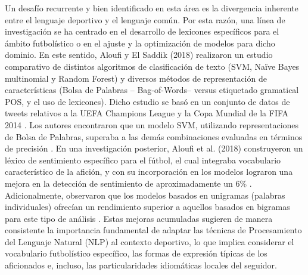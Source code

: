 Un desafío recurrente y bien identificado en esta área es la divergencia inherente entre el lenguaje deportivo y el lenguaje común. Por esta razón, una línea de investigación se ha centrado en el desarrollo de lexicones específicos para el ámbito futbolístico o en el ajuste y la optimización de modelos para dicho dominio. En este sentido, Aloufi y El Saddik (2018) realizaron un estudio comparativo de distintos algoritmos de clasificación de texto (SVM, Naïve Bayes multinomial y Random Forest) y diversos métodos de representación de características (Bolsa de Palabras – Bag-of-Words– versus etiquetado gramatical POS, y el uso de lexicones). Dicho estudio se basó en un conjunto de datos de tweets relativos a la UEFA Champions League y la Copa Mundial de la FIFA 2014 \cite{Selak2024}. Los autores encontraron que un modelo SVM, utilizando representaciones de Bolsa de Palabras, superaba a las demás combinaciones evaluadas en términos de precisión \cite{Selak2024}. En una investigación posterior, Aloufi et al. (2018) construyeron un léxico de sentimiento específico para el fútbol, el cual integraba vocabulario característico de la afición, y con su incorporación en los modelos lograron una mejora en la detección de sentimiento de aproximadamente un 6\% \cite{Selak2024}. Adicionalmente, observaron que los modelos basados en unigramas (palabras individuales) ofrecían un rendimiento superior a aquellos basados en bigramas para este tipo de análisis \cite{Selak2024}. Estas mejoras acumuladas sugieren de manera consistente la importancia fundamental de adaptar las técnicas de Procesamiento del Lenguaje Natural (NLP) al contexto deportivo, lo que implica considerar el vocabulario futbolístico específico, las formas de expresión típicas de los aficionados e, incluso, las particularidades idiomáticas locales del seguidor.\\

